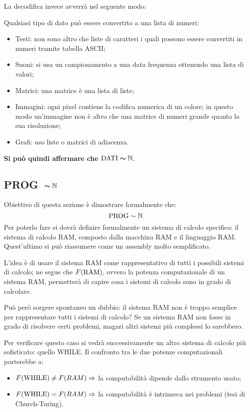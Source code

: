 La decodifica invece avverrà nel seguente modo:
\begin{figure}[H]
    \centering
    
\end{figure}

Qualsiasi tipo di dato può essere convertito a una lista di numeri:
\begin{itemize}
    \item Testi: non sono altro che liste di caratteri i quali possono essere convertiti
        in numeri tramite tabella ASCII;
    \item Suoni: si usa un campionamento a una data frequenza ottenendo una lista di
        valori;
    \item Matrici: una matrice è una lista di liste;
    \item Immagini: ogni pixel contiene la codifica numerica di un colore; in questo modo
    un'immagine non è altro che una matrice di numeri grande quanto la sua risoluzione;
    \item Grafi: uso liste o matrici di adiacenza.
\end{itemize}

\textbf{Si può quindi affermare che $\bm{\text{DATI}\sim\mathbb{N}}$}.

\subsection{\texorpdfstring{PROG\ $\bm{\sim\mathbb{N}}$}{PROG~N}}
Obiettivo di questa sezione è dimostrare formalmente che:
$$ \text{PROG} \sim \mathbb{N} $$
Per poterlo fare si dovrà definire formalmente un sistema di calcolo specifico: il sistema 
di calcolo RAM, composto dalla macchina RAM e il linguaggio RAM. Quest'ultimo si può 
riassumere come un assembly molto semplificato.

L'idea è di usare il sistema RAM come rappresentativo di tutti i possibili sistemi di calcolo;
ne segue che $F(\text{RAM})$, ovvero la potenza computazionale di un sistema RAM, permetterà
di capire cosa i sistemi di calcolo sono in grado di calcolare.

Può però sorgere spontaneo un dubbio: il sistema RAM non è troppo semplice per rappresentare
tutti i sistemi di calcolo? Se un sistema RAM non fosse in grado di risolvere
certi problemi, magari altri sistemi più complessi lo sarebbero.

Per verificare questo caso si vedrà successivamente un altro sistema di calcolo più
sofisticato: quello WHILE. Il confronto tra le due potenze computazionali porterebbe a:
\begin{itemize}
    \item $F(\text{WHILE})\neq F(RAM) \Rightarrow$ la computabilità dipende dallo strumento usato;
    \item $F(\text{WHILE})=F(RAM) \Rightarrow$ la computabilità è intrinseca nei problemi 
        (tesi di Church-Turing).
\end{itemize}

